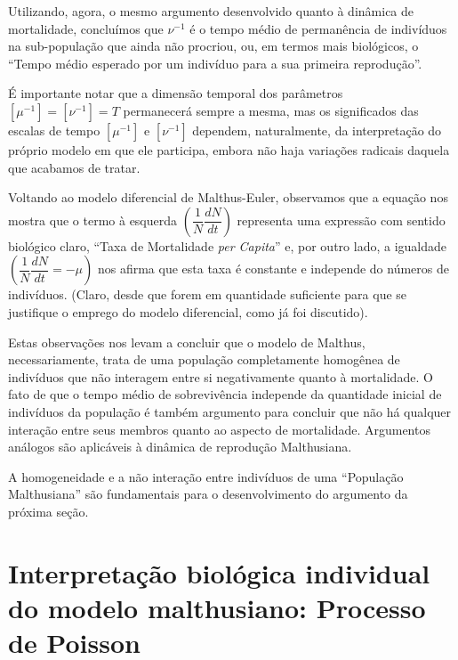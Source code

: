     Utilizando, agora, o mesmo argumento desenvolvido quanto à dinâmica de mortalidade, concluímos que \(\nu^{-1}\) é o tempo médio de permanência de indivíduos na sub-população que ainda não procriou, ou, em termos mais biológicos, o ``Tempo médio esperado por um indivíduo para a sua primeira reprodução''.

    É importante notar que a dimensão temporal dos parâmetros \([\mu^{-1}] = [\nu^{-1}] = T\) permanecerá sempre a mesma, mas os significados das escalas de tempo \([\mu^{-1}]\) e \([\nu^{-1}]\) dependem, naturalmente, da interpretação do próprio modelo em que ele participa, embora não haja variações radicais daquela que acabamos de tratar.

    Voltando ao modelo diferencial de Malthus-Euler, observamos que a equação nos mostra que o termo à esquerda \(\left(\dfrac{1}{N} \dfrac{dN}{dt}\right)\) representa uma expressão com sentido biológico claro, ``Taxa de Mortalidade \textit{per Capita}'' e, por outro lado, a igualdade \(\left(\dfrac{1}{N} \dfrac{dN}{dt} = -\mu\right)\) nos afirma que esta taxa é constante e independe do números de indivíduos. (Claro, desde que forem em quantidade suficiente para que se justifique o emprego do modelo diferencial, como já foi discutido).

    Estas observações nos levam a concluir que o modelo de Malthus, necessariamente, trata de uma população completamente homogênea de indivíduos que não interagem entre si negativamente quanto à mortalidade. O fato de que o tempo médio de sobrevivência independe da quantidade inicial de indivíduos da população é também argumento para concluir que não há qualquer interação entre seus membros quanto ao aspecto de mortalidade. Argumentos análogos são aplicáveis à dinâmica de reprodução Malthusiana.
    
    A homogeneidade e a não interação entre indivíduos de uma ``População Malthusiana'' são fundamentais para o desenvolvimento do argumento da próxima seção.


\section{Interpretação biológica individual do modelo malthusiano: Processo de Poisson}

